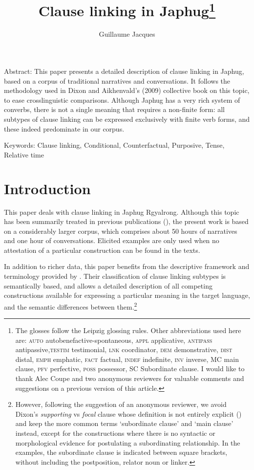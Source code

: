 \documentclass[oldfontcommands,oneside,a4paper,11pt]{article}
\begin{document}
 
\linenumbers
\title{Clause linking in Japhug\footnote{
The glosses follow the Leipzig glossing rules. Other abbreviations used here are: \textsc{auto}  autobenefactive-spontaneous, \textsc{appl} applicative, \textsc{antipass} antipassive,\textsc{testim} testimonial, \textsc{lnk} coordinator, \textsc{dem} demonstrative, \textsc{dist} distal, \textsc{emph} emphatic, \textsc{fact} factual, \textsc{indef} indefinite, \textsc{inv} inverse,  MC main clause, \textsc{pfv} perfective, \textsc{poss} possessor,  SC Subordinate clause. I would like to thank Alec Coupe and two anonymous reviewers for valuable comments and suggestions on a previous version of this article.
} }
\author{Guillaume Jacques}
\maketitle

Abstract: This paper presents a detailed description of clause linking in Japhug, based on a corpus of traditional narratives and conversations. It follows the methodology used in Dixon and Aikhenvald's (2009) collective book on this topic, to ease crosslinguistic comparisons. Although Japhug has a very rich system of converbs, there is not a single meaning that requires a non-finite form: all subtypes of clause linking can be expressed exclusively with finite verb forms, and these indeed predominate in our corpus.

Keywords: Clause linking, Conditional, Counterfactual, Purposive, Tense, Relative time 

\section{Introduction}

This paper  deals with clause linking in Japhug Rgyalrong. Although this topic has been summarily treated in previous publications (\citealt[317-325]{jacques08}), the present work is based on a considerably larger corpus, which comprises about 50 hours of narratives and one hour of conversations. Elicited examples are only used when no attestation of a particular construction can be found in the texts. 

In addition to richer data, this paper  benefits from the descriptive framework and terminology provided by \citet{dixon09clause.linking}. Their classification of clause linking subtypes is semantically based, and allows a detailed description of all competing constructions available for expressing a particular meaning in the target language, and the semantic differences between them.\footnote{However,  following the suggestion of an anonymous reviewer, we avoid  Dixon's   \textit{supporting}   vs \textit{focal} clause whose definition is not entirely explicit (\citealt[2-5]{dixon09intro}) and keep the  more common terms `subordinate clause' and `main clause'  instead, except for the constructions where there is no syntactic or morphological evidence for postulating a subordinating relationship. In the examples, the subordinate clause is indicated between square brackets, without including the postposition, relator noun or linker.}
\end{document}
